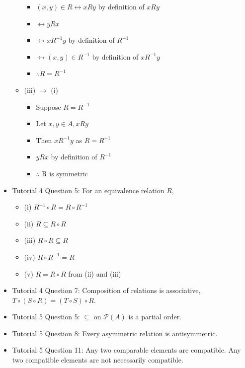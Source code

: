 \documentclass[10pt, portrait]{article}
\begin{document}
\begin{multicols*}{2}
\begin{itemize}
\begin{itemize}
\begin{itemize}
            \item $(x, y) \in R \leftrightarrow x R y$ by definition of $x R y$
            \item $\leftrightarrow y R x$
            \item $\leftrightarrow x R^{-1} y$ by definition of $R^{-1}$
            \item $\leftrightarrow (x, y) \in R^{-1}$ by definition of $x R^{-1} y$
            \item $\therefore R = R^{-1}$
        \end{itemize}
        \item (iii) $\rightarrow$ (i)
        \begin{itemize}
            \item Suppose $R = R^{-1}$
            \item Let $x, y \in A, x R y$
            \item Then $x R^{-1} y$ as $R = R^{-1}$
            \item $y R x$ by definition of $R^{-1}$
            \item $\therefore$ R is symmetric
        \end{itemize}
    \end{itemize}
    \item Tutorial 4 Question 5: For an equivalence relation $R$,
    \begin{itemize}
        \item (i) $R^{-1} \circ R = R \circ R^{-1}$
        \item (ii) $R \subseteq R \circ R$
        \item (iii) $R \circ R \subseteq R$
        \item (iv) $R \circ R^{-1} = R$
        \item (v) $R = R \circ R$ from (ii) and (iii)
    \end{itemize}
    \item Tutorial 4 Question 7: Composition of relations is associative, $T \circ (S \circ R) = (T \circ S) \circ R$.
    \item Tutorial 5 Question 5: $\subseteq$ on $\mathcal{P}(A)$ is a partial order.
    \item Tutorial 5 Question 8: Every asymmetric relation is antisymmetric.
    \item Tutorial 5 Question 11: Any two comparable elements are compatible. Any two compatible elements are not necessarily compatible.
\end{itemize}
\end{multicols*}
\end{document}
